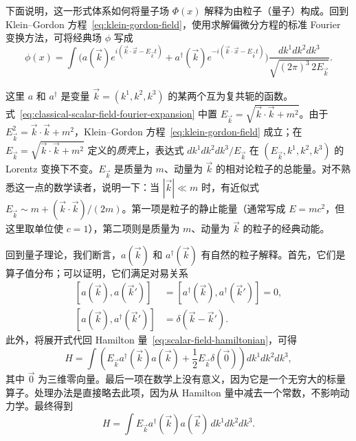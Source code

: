 下面说明，这一形式体系如何将量子场 $\Phi(x)$ 解释为由粒子（量子）构成。回到 Klein--Gordon 方程~\eqref{eq:klein-gordon-field}，使用求解偏微分方程的标准 Fourier 变换方法，可将经典场 $\phi$ 写成
\begin{equation}\label{eq:classical-scalar-field-fourier-expansion}
\phi(x)=\int\bigl(
a(\vec k)e^{i(\vec k\cdot\vec x-E_{\vec k}t)}
+a^\dagger(\vec k)e^{-i(\vec k\cdot\vec x-E_{\vec k}t)}
\bigr)\frac{dk^1dk^2dk^3}{\sqrt{(2\pi)^3\,2E_{\vec k}}}.
\end{equation}

这里 $a$ 和 $a^\dagger$ 是变量 $\vec k=(k^1,k^2,k^3)$ 的某两个互为复共轭的函数。式~\eqref{eq:classical-scalar-field-fourier-expansion} 中置 $E_{\vec k}=\sqrt{\vec k\cdot\vec k+m^2}$。由于 $E_{\vec k}^2=\vec k\cdot\vec k+m^2$，Klein--Gordon 方程~\eqref{eq:klein-gordon-field} 成立；在 $E_{\vec k}=\sqrt{\vec k\cdot\vec k+m^2}$ 定义的\emph{质壳}上，表达式 $dk^1dk^2dk^3/E_{\vec k}$ 在 $(E_{\vec k},k^1,k^2,k^3)$ 的 Lorentz 变换下不变。$E_{\vec k}$ 是质量为 $m$、动量为 $\vec k$ 的相对论粒子的总能量。对不熟悉这一点的数学读者，说明一下：当 $|\vec k|\ll m$ 时，有近似式 $E_{\vec k}\sim m+(\vec k\cdot\vec k)/(2m)$。第一项是粒子的静止能量（通常写成 $E=mc^2$，但这里取单位使 $c=1$），第二项则是质量为 $m$、动量为 $\vec k$ 的粒子的经典动能。

回到量子理论，我们断言，$a(\vec k)$ 和 $a^\dagger(\vec k)$ 有自然的粒子解释。首先，它们是算子值分布；可以证明，它们满足对易关系
\begin{equation}\label{eq:scalar-creation-annihilation-commutators}
\begin{aligned}
[a(\vec k),a(\vec k')]&=[a^\dagger(\vec k),a^\dagger(\vec k')]=0,\\
[a(\vec k),a^\dagger(\vec k')]&=\delta(\vec k-\vec k').
\end{aligned}
\end{equation}
此外，将展开式代回 Hamilton 量~\eqref{eq:scalar-field-hamiltonian}，可得
\[
H=\int\left(E_{\vec k}a^\dagger(\vec k)a(\vec k)
+\frac12E_{\vec k}\delta(\vec0)\right)dk^1dk^2dk^3,
\]
其中 $\vec0$ 为三维零向量。最后一项在数学上没有意义，因为它是一个无穷大的标量算子。处理办法是直接略去此项，因为从 Hamilton 量中减去一个常数，不影响动力学。最终得到
\begin{equation}\label{eq:normal-ordered-scalar-hamiltonian}
H=\int E_{\vec k}a^\dagger(\vec k)a(\vec k)\,dk^1dk^2dk^3.
\end{equation}

